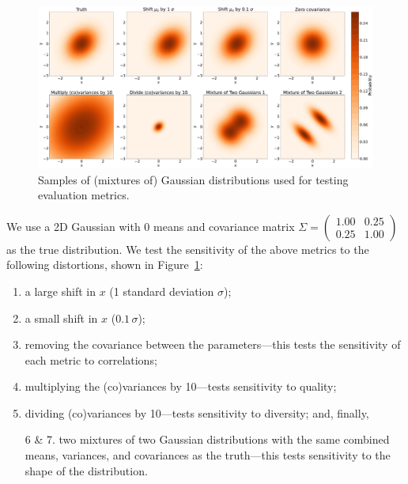 \begin{figure}[htbp]
    \includegraphics[width=\textwidth]{figures/04-ML4Sim/evaluating/test_dists.pdf}
    \caption{Samples of (mixtures of) Gaussian distributions used for testing evaluation metrics.}
    \label{fig:04_evaluating_toydists}
\end{figure}

\begingroup  %
\setlength{\lineskip}{5pt}

We use a 2D Gaussian with 0 means and covariance matrix $\Sigma = \left(\begin{smallmatrix}
    1.00 & 0.25 \\ 0.25 & 1.00
\end{smallmatrix}\right)$ as the true distribution.
We test the sensitivity of the above metrics to the following distortions, shown in Figure~\ref{fig:04_evaluating_toydists}:

\endgroup

\begin{enumerate}
    \item a large shift in $x$ (1 standard deviation $\sigma$);
    \item a small shift in $x$ ($0.1\,\sigma$);
    \item removing the covariance between the parameters---this tests the sensitivity of each metric to correlations;
    \item multiplying the (co)variances by 10---tests sensitivity to quality;
    \item dividing (co)variances by 10---tests sensitivity to diversity; and, finally,
    \item[6 \& 7.] two mixtures of two Gaussian distributions with the same combined means, variances, and covariances as the truth---this tests sensitivity to the shape of the distribution.
\end{enumerate}

